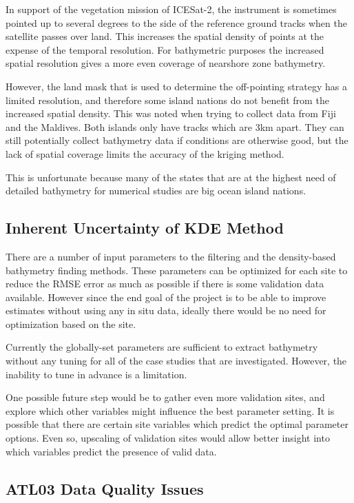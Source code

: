 In support of the vegetation mission of ICESat-2, the instrument is sometimes pointed up to several degrees to the side of the reference ground tracks when the satellite passes over land. This increases the spatial density of points at the expense of the temporal resolution. For bathymetric purposes the increased spatial resolution gives a more even  coverage of nearshore zone bathymetry. 

However, the land mask that is used to determine the off-pointing strategy has a limited resolution, and therefore some island nations do not benefit from the increased spatial density. This was noted when trying to collect data from Fiji and the Maldives. Both islands only have tracks which are 3km apart. They can still potentially collect bathymetry data if conditions are otherwise good, but the lack of spatial coverage limits the accuracy of the kriging method.

This is unfortunate because many of the states that are at the highest need of detailed bathymetry for numerical studies are big ocean island nations.

\subsection{Inherent Uncertainty of KDE Method}
There are a number of input parameters to the filtering and the density-based bathymetry finding methods. These parameters can be optimized for each site to reduce the RMSE error as much as possible if there is some validation data available. However since the end goal of the project is to be able to improve estimates without using any in situ data, ideally there would be no need for optimization based on the site.

Currently the globally-set parameters are sufficient to extract bathymetry without any tuning for all of the case studies that are investigated. However, the inability to tune in advance is a limitation. 

One possible future step would be to gather even more validation sites, and explore which other variables might influence the best parameter setting. It is possible that there are certain site variables which predict the optimal parameter options. Even so, upscaling of validation sites would allow better insight into which variables predict the presence of valid data.  

\subsection{ATL03 Data Quality Issues}\label{sec:discussion-photon-issues}

